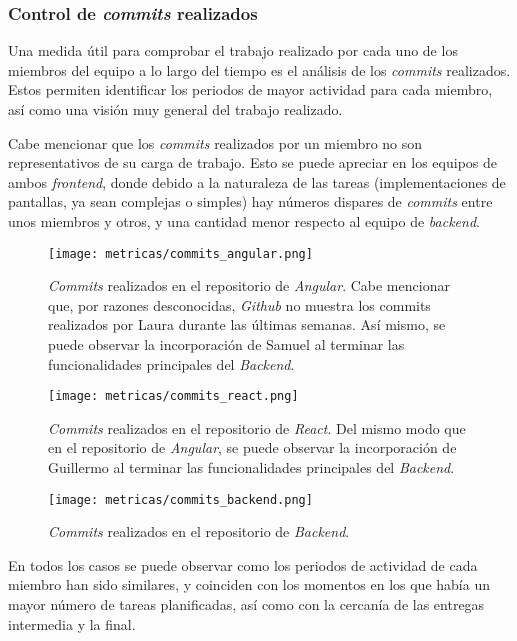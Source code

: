 \documentclass[11pt, a4paper, titlepage]{article}
\begin{document}
\subsubsection{Control de \textit{commits} realizados}
Una medida útil para comprobar el trabajo realizado por cada uno de los miembros del equipo a lo largo del tiempo es el análisis de los \textit{commits} realizados. Estos permiten identificar los periodos de mayor actividad para cada miembro, así como una visión muy general del trabajo realizado. 

Cabe mencionar que los \textit{commits} realizados por un miembro no son representativos de su carga de trabajo. Esto se puede apreciar en los equipos de ambos \textit{frontend}, donde debido a la naturaleza de las tareas (implementaciones de pantallas, ya sean complejas o simples) hay números dispares de \textit{commits} entre unos miembros y otros, y una cantidad menor respecto al equipo de \textit{backend}.

\begin{figure}[!h]
    \centering
    \texttt{[image: metricas/commits\_angular.png]}
    \caption{\textit{Commits} realizados en el repositorio de \textit{Angular}. Cabe mencionar que, por razones desconocidas, \textit{Github} no muestra los commits realizados por Laura durante las últimas semanas. Así mismo, se puede observar la incorporación de Samuel al terminar las funcionalidades principales del \textit{Backend}.}
    \label{fig:my_label}
\end{figure}

\begin{figure}[!h]
    \centering
    \texttt{[image: metricas/commits\_react.png]}
    \caption{\textit{Commits} realizados en el repositorio de \textit{React}. Del mismo modo que en el repositorio de \textit{Angular}, se puede observar la incorporación de Guillermo al terminar las funcionalidades principales del \textit{Backend}.}
    \label{fig:my_label}
\end{figure}

\begin{figure}[!h]
    \centering
    \texttt{[image: metricas/commits\_backend.png]}
    \caption{\textit{Commits} realizados en el repositorio de \textit{Backend}.}
    \label{fig:my_label}
\end{figure}
\FloatBarrier
En todos los casos se puede observar como los periodos de actividad de cada miembro han sido similares, y coinciden con los momentos en los que había un mayor número de tareas planificadas, así como con la cercanía de las entregas intermedia y la final.
\end{document}

